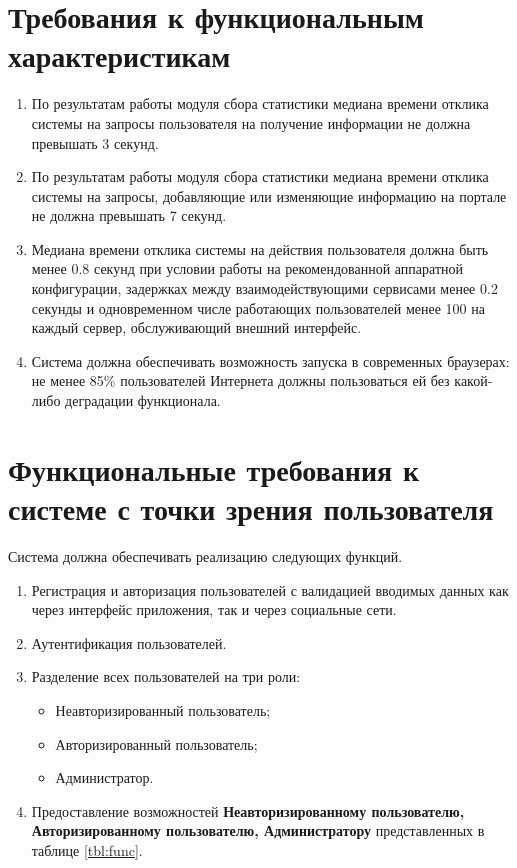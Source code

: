 \section*{Требования к функциональным характеристикам}
\begin{enumerate}
	\item По результатам работы модуля сбора статистики медиана времени отклика системы на запросы пользователя на получение информации не должна превышать 3 секунд.
	
	\item По результатам работы модуля сбора статистики медиана времени отклика системы на запросы, добавляющие или изменяющие информацию на портале не должна превышать 7 секунд.
	
	\item Медиана времени отклика системы на действия пользователя должна быть менее 0.8 секунд при условии работы на рекомендованной аппаратной конфигурации, задержках между взаимодействующими сервисами менее 0.2 секунды и одновременном числе работающих пользователей менее 100 на каждый сервер, обслуживающий внешний интерфейс.
	
	\item Система должна обеспечивать возможность запуска в современных браузерах: не менее 85\% пользователей Интернета должны пользоваться ей без какой-либо деградации функционала.
\end{enumerate}

\section*{Функциональные требования к системе с точки зрения пользователя}
Система должна обеспечивать реализацию следующих функций.
\begin{enumerate}
	\item Регистрация и авторизация пользователей с валидацией вводимых данных как через интерфейс приложения, так и через	социальные сети.
	
	\item Аутентификация пользователей.
	
	\item Разделение всех пользователей на три роли:
	\begin{itemize}
		\item Неавторизированный пользователь;
		
		\item Авторизированный пользователь;
		
		\item Администратор.
	\end{itemize}
	
	\item Предоставление возможностей \textbf{Неавторизированному пользователю, Авторизированному пользователю, Администратору} представленных в таблице \ref{tbl:func}.
\end{enumerate}

